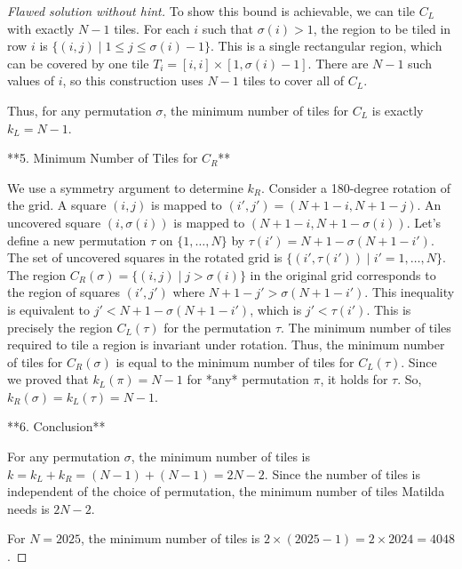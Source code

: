 \begin{proof} [Flawed solution without hint]
To show this bound is achievable, we can tile $C_L$ with exactly $N-1$ tiles. For each $i$ such that $\sigma(i)>1$, the region to be tiled in row $i$ is $\{(i,j) \mid 1 \le j \le \sigma(i)-1\}$. This is a single rectangular region, which can be covered by one tile $T_i = [i,i] \times [1, \sigma(i)-1]$. There are $N-1$ such values of $i$, so this construction uses $N-1$ tiles to cover all of $C_L$.

Thus, for any permutation $\sigma$, the minimum number of tiles for $C_L$ is exactly $k_L = N-1$.

**5. Minimum Number of Tiles for $C_R$**

We use a symmetry argument to determine $k_R$. Consider a 180-degree rotation of the grid. A square $(i,j)$ is mapped to $(i',j') = (N+1-i, N+1-j)$. An uncovered square $(i, \sigma(i))$ is mapped to $(N+1-i, N+1-\sigma(i))$.
Let's define a new permutation $\tau$ on $\{1, \dots, N\}$ by $\tau(i') = N+1-\sigma(N+1-i')$. The set of uncovered squares in the rotated grid is $\{(i', \tau(i')) \mid i'=1, \dots, N\}$.
The region $C_R(\sigma) = \{(i,j) \mid j > \sigma(i)\}$ in the original grid corresponds to the region of squares $(i',j')$ where $N+1-j' > \sigma(N+1-i')$. This inequality is equivalent to $j' < N+1-\sigma(N+1-i')$, which is $j' < \tau(i')$. This is precisely the region $C_L(\tau)$ for the permutation $\tau$.
The minimum number of tiles required to tile a region is invariant under rotation. Thus, the minimum number of tiles for $C_R(\sigma)$ is equal to the minimum number of tiles for $C_L(\tau)$.
Since we proved that $k_L(\pi) = N-1$ for *any* permutation $\pi$, it holds for $\tau$. So, $k_R(\sigma) = k_L(\tau) = N-1$.

**6. Conclusion**

For any permutation $\sigma$, the minimum number of tiles is $k = k_L + k_R = (N-1) + (N-1) = 2N-2$.
Since the number of tiles is independent of the choice of permutation, the minimum number of tiles Matilda needs is $2N-2$.

For $N=2025$, the minimum number of tiles is $2 \times (2025-1) = 2 \times 2024 = 4048$.
\end{proof}


